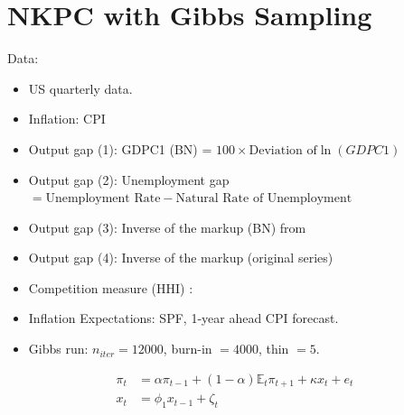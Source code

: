 \documentclass[letterpaper,12pt]{article}
\begin{document}
\section*{NKPC with Gibbs Sampling}
  Data:
  \begin{itemize}
    \item US quarterly data.
    \item Inflation: CPI
    \item Output gap (1): GDPC1 (BN) = $100 \times \text{Deviation of} \ln(GDPC1)$
    \item Output gap (2): Unemployment gap $  = \text{Unemployment Rate} - \text{Natural Rate of Unemployment}$
    \item Output gap (3): Inverse of the markup (BN) from 
    \item Output gap (4): Inverse of the markup (original series)
    \item Competition measure (HHI) : 
    \item Inflation Expectations: SPF, 1-year ahead CPI forecast.
    \item Gibbs run: $n_{iter}=12000$, burn-in $=4000$, thin $=5$.
  \end{itemize}

  \begin{equation*}
    \begin{aligned}
      \pi_t &= \alpha \pi_{t-1} + (1-\alpha)\mathbb{E}_t \pi_{t+1} + \kappa x_t + e_t \\
      x_t &= \phi_1 x_{t-1} + \zeta_t
    \end{aligned}
  \end{equation*}
\end{document}
